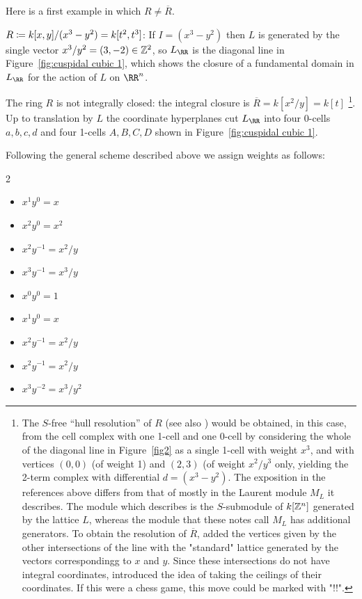 \documentclass{amsart}
\begin{document}
Here is a first example in which $R \neq \overline R$.

\begin{example} 
  \label{ex:cuspidal-cubic}
  $R\coloneqq k[x,y]/(x^3-y^2) = k[t^{2},t^{3}]$:
If $I = (x^3-y^2)$ then $L$ is generated by the single vector
$x^3/y^2 = (3,-2) \in \mathbb Z^2$, so
$L_\RR$ is the diagonal line in Figure~\ref{fig:cuspidal cubic 1}, which
shows the closure of a fundamental domain in $L_\RR$ for the action of $L$
on $\RR^n$.

The ring $R$ is not integrally closed: the integral closure is $\overline R = k[x^{2}/y] = k[t]$
\footnote{The $S$-free ``hull resolution'' of $R$ \cite[Section 3]{Bayer-Sturmfels} (see also \cite[Sections 9.2--9.3]{MScomb}) would be obtained, in this case, from the cell complex with one 1-cell and one 0-cell by considering the whole of the diagonal line in Figure~\ref{fig2} as a single 1-cell with weight $x^3$, and with vertices
$(0,0)$ (of weight 1) and $(2,3)$ (of weight $x^2/y^3$ only, yielding the 2-term complex with differential
$d = (x^3-y^2)$.
The exposition in the references above differs from
that of \cite{BCHSY} mostly in the Laurent module $M_L$ it describes. The module which \cite{Bayer-Sturmfels} describes is the $S$-submodule of $k[\mathbb Z^n]$ generated by the lattice $L$, whereas the module that these notes call $M_L$ has additional generators.
To obtain the resolution of $\overline R$, \cite{BCHSY} added the vertices given by
the other intersections of the line with the "standard" lattice generated
by the vectors correspondingg to $x$ and $y$. Since these intersections do not have integral coordinates, \cite{BCHSY} introduced the idea of taking the ceilings of 
their coordinates. 
If this were a chess game, this move could be marked with "!!".}.
Up to translation by $L$ the coordinate hyperplanes cut $L_\RR$ into four 0-cells $a,b,c,d$ and four 1-cells $A,B,C,D$ shown in Figure~\ref{fig:cuspidal cubic 1}.

\goodbreak


Following the general scheme described above we assign weights as follows:
\begin{multicols}{2}
  \begin{itemize}
  \item[$\Psi(A)$:] $x^1y^0 = x$
  \item[$\Psi(B)$:] $x^2y^0 = x^2$
  \item[$\Psi(C)$:] $x^2y^{-1} = x^2/y$
  \item[$\Psi(D)$:] $x^3y^{-1} = x^3/y$
    \smallskip
  \item[$\Psi(a)$:] $x^0y^0 = 1$
  \item[$\Psi(b)$:] $x^1y^0 = x$
  \item[$\Psi(c)$:] $x^2y^{-1} = x^2/y$
  \item[$\Psi(d)$:] $x^2y^{-1} = x^2/y$
  \item[$\Psi(e)$:] $x^3y^{-2} = x^3/y^{2}$
  \end{itemize}
\end{multicols}


\end{example}
\end{document}
